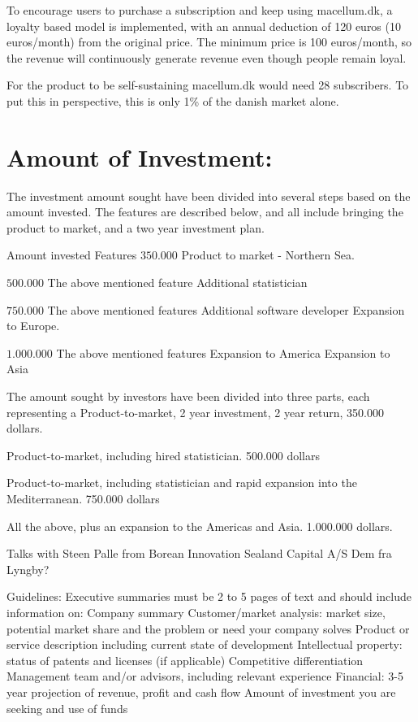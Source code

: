 \documentclass[12pt]{article}
\begin{document}
To encourage users to purchase a subscription and keep using macellum.dk, a loyalty based model is implemented, with an annual deduction of 120 euros (10 euros/month) from the original price. The minimum price is 100 euros/month, so the revenue will continuously generate revenue even though people remain loyal. 

For the product to be self-sustaining macellum.dk would need 28 subscribers. To put this in perspective, this is only 1\% of the danish market alone.

\section{Amount of Investment:}
The investment amount sought have been divided into several steps based on the amount invested. The features are described below, and all include bringing the product to market, and a two year investment plan.

Amount invested
Features
$350.000$
Product to market - Northern Sea. 

$500.000$
The above mentioned feature
Additional statistician

$750.000$
The above mentioned features
Additional software developer
Expansion to Europe.

$1.000.000$
The above mentioned features
Expansion to America
Expansion to Asia

The amount sought by investors have been divided into three parts, each representing a 
Product-to-market, 2 year investment, 2 year return,
350.000 dollars.

Product-to-market, including hired statistician.
500.000 dollars

Product-to-market, including statistician and rapid expansion into the Mediterranean.
750.000 dollars

All the above, plus an expansion to the Americas and Asia. 
1.000.000 dollars.

Talks with Steen Palle from Borean Innovation
Sealand Capital A/S
Dem fra Lyngby?


Guidelines: Executive summaries must be 2 to 5 pages of text and should include information on: 
Company summary  
Customer/market analysis: market size, potential market share and the problem or need your company solves  
Product or service description including current state of development  
Intellectual property: status of patents and licenses (if applicable)  
Competitive differentiation  
Management team and/or advisors, including relevant experience  
Financial: 3-5 year projection of revenue, profit and cash flow  
Amount of investment you are seeking and use of funds
\end{document}
